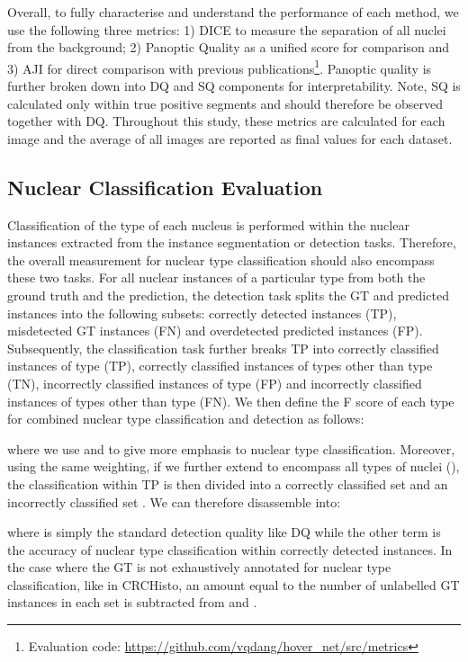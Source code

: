\documentclass[journal]{IEEEtran}
\begin{document}
    Overall, to fully characterise and understand the performance of each method, we use the following three metrics: 1) DICE to measure the separation of all nuclei from the background; 2) Panoptic Quality as a unified score for comparison and 3) AJI for direct comparison with previous publications\footnote{Evaluation code:  \url{https://github.com/vqdang/hover\_net/src/metrics}}. Panoptic quality is further broken down into DQ and SQ components for interpretability. Note, SQ is calculated only within true positive segments and should therefore be observed together with DQ. Throughout this study, these metrics are calculated for each image and the average of all images are reported as final values for each dataset.
    \subsection{Nuclear Classification Evaluation} \label{section:metrics_class}
   
   Classification of the type of each nucleus is performed within the nuclear instances extracted from the instance segmentation or detection tasks. Therefore, the overall measurement for nuclear type classification should also encompass these two tasks. For all nuclear instances of a particular type  from both the ground truth and the prediction, the detection task  splits the GT and predicted instances into the following subsets: correctly detected instances (TP), misdetected GT instances (FN) and overdetected predicted instances (FP). Subsequently, the classification task  further breaks TP into correctly classified instances of type  (TP), correctly classified instances of types other than type  (TN), incorrectly classified instances of type  (FP) and incorrectly classified instances of types other than type  (FN). We then define the F score of each type  for combined nuclear type classification and detection as follows:
    
    \noindent where we use  and  to give more emphasis to nuclear type classification. Moreover, using the same weighting, if we further extend  to encompass all types of nuclei  (), the classification within TP is then divided into a correctly classified set  and an incorrectly classified set . We can therefore disassemble  into:
    
    where  is simply the standard detection quality like DQ while the other term is the accuracy of nuclear type classification within correctly detected instances. In the case where the GT is not exhaustively annotated for nuclear type classification, like in CRCHisto, an amount equal to the number of unlabelled GT instances in each set is subtracted from  and . 
    
\end{document}
